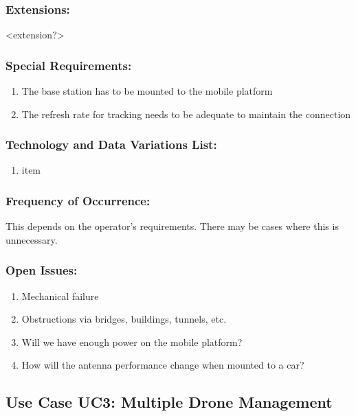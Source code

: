 \documentclass[ProductRequirements.tex]{subfiles}
\begin{document}
	\subsubsection*{Extensions:}
	<extension?>
	\subsubsection*{Special Requirements:}
	\begin{enumerate}\itemsep1pt
		\item The base station has to be mounted to the mobile platform
		\item The refresh rate for tracking needs to be adequate to maintain the connection
	\end{enumerate}
	\subsubsection*{Technology and Data Variations List:}
	\begin{enumerate}\itemsep1pt
		\item item
	\end{enumerate}
	\subsubsection*{Frequency of Occurrence:}
	This depends on the operator's requirements. There may be cases where this is unnecessary.
	\subsubsection*{Open Issues:}
	\begin{enumerate}\itemsep1pt
		\item Mechanical failure
		\item Obstructions via bridges, buildings, tunnels, etc.
		\item Will we have enough power on the mobile platform?
		\item How will the antenna performance change when mounted to a car?
	\end{enumerate}	
	

	
	
	\subsection{Use Case UC3: Multiple Drone Management}
\end{document}
